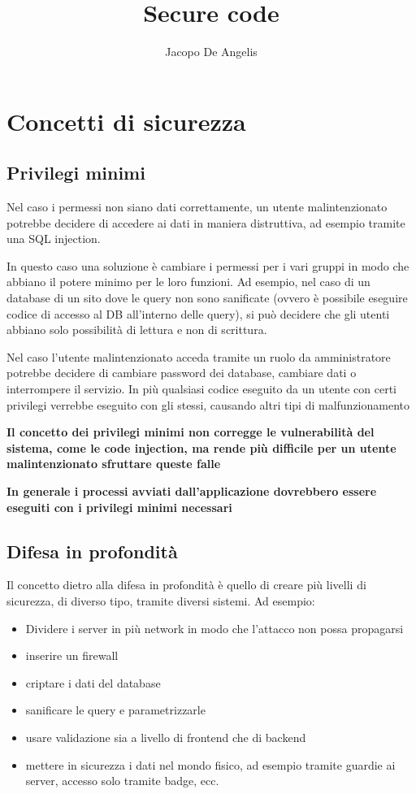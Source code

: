 \documentclass[11pt,a4paper]{book}
\begin{document}
\title{Secure code}
\author{Jacopo De Angelis}
\maketitle

\pagebreak
\tableofcontents
\pagebreak

\chapter{Concetti di sicurezza}
\section{Privilegi minimi}\label{sec: privilegi minimi}
Nel caso i permessi non siano dati correttamente, un utente malintenzionato potrebbe decidere di accedere ai dati in maniera distruttiva, ad esempio tramite una SQL injection.

In questo caso una soluzione è cambiare i permessi per i vari gruppi in modo che abbiano il potere minimo per le loro funzioni. Ad esempio, nel caso di un database di un sito dove le query non sono sanificate (ovvero è possibile eseguire codice di accesso al DB all'interno delle query), si può decidere che gli utenti abbiano solo possibilità di lettura e non di scrittura.

Nel caso l'utente malintenzionato acceda tramite un ruolo da amministratore potrebbe decidere di cambiare password dei database, cambiare dati o interrompere il servizio. In più qualsiasi codice eseguito da un utente con certi privilegi verrebbe eseguito con gli stessi, causando altri tipi di malfunzionamento

\textbf{Il concetto dei privilegi minimi non corregge le vulnerabilità del sistema, come le code injection, ma rende più difficile per un utente malintenzionato sfruttare queste falle}

\textbf{In generale i processi avviati dall'applicazione dovrebbero essere eseguiti con i privilegi minimi necessari}

\section{Difesa in profondità}\label{sec: difesa in profondità}
Il concetto dietro alla difesa in profondità è quello di creare più livelli di sicurezza, di diverso tipo, tramite diversi sistemi. Ad esempio:
\begin{itemize}
	\item Dividere i server in più network in modo che l'attacco non possa propagarsi
	\item inserire un firewall
	\item criptare i dati del database
	\item sanificare le query e parametrizzarle
	\item usare validazione sia a livello di frontend che di backend
	\item mettere in sicurezza i dati nel mondo fisico, ad esempio tramite guardie ai server, accesso solo tramite badge, ecc.
\end{itemize}
\end{document}
